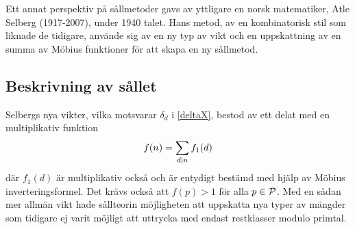 Ett annat perspektiv på sållmetoder gavs av yttligare en norsk matematiker, Atle Selberg (1917-2007), under 1940 talet. 
Hans metod, av en kombinatorisk stil som liknade de tidigare, använde sig av en ny typ av vikt och en uppskattning av en summa av Möbius funktioner för att skapa en ny sållmetod.

\subsection{Beskrivning av sållet}
Selbergs nya vikter, vilka motsvarar \(\delta_d\) i \eqref{deltaX}, bestod av ett delat med en multiplikativ funktion 
\begin{equation}
    f(n) = \sum_{d\divides n}f_1(d)\nonumber
\end{equation}
där \(f_1(d)\) är  multiplikativ också och är entydigt bestämd med hjälp av Möbius inverteringsformel. Det krävs också att \(f(p) > 1\) för alla \(p\in\P\). 
Med en sådan mer allmän vikt hade sållteorin möjligheten att uppskatta nya typer av mängder som tidigare ej varit möjligt att uttrycka med endast restklasser modulo primtal. 

